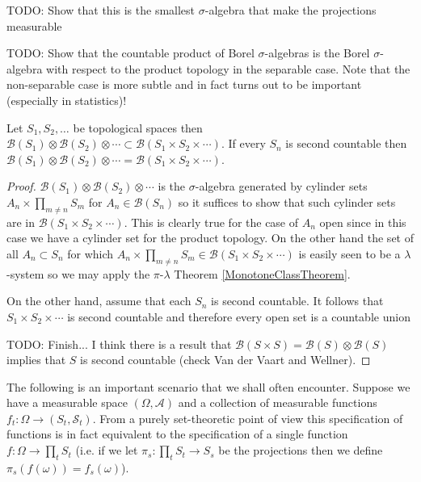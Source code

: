TODO: Show that this is the smallest $\sigma$-algebra that make the
projections measurable

TODO: Show that the countable product of Borel $\sigma$-algebras is the Borel
$\sigma$-algebra with respect to the product topology in the separable
case.  Note that the non-separable case is more subtle and in fact
turns out to be important (especially in statistics)!

\begin{prop}\label{BorelProductSigmaAlgebrasOnProductSpaces}Let $S_1, S_2, \dotsc$ be topological spaces then
  $\mathcal{B}(S_1) \otimes \mathcal{B}(S_2) \otimes \dotsb \subset
  \mathcal{B}(S_1 \times S_2 \times \dotsb)$.  If every $S_n$ is
  second countable then $\mathcal{B}(S_1) \otimes \mathcal{B}(S_2) \otimes \dotsb =
  \mathcal{B}(S_1 \times S_2 \times \dotsb)$.
\end{prop}
\begin{proof}
$\mathcal{B}(S_1) \otimes \mathcal{B}(S_2) \otimes \dotsb$ is the
$\sigma$-algebra generated by cylinder sets $A_n \times \prod_{m \neq
  n} S_m$ for $A_n \in \mathcal{B}(S_n)$ so it suffices to show that
such cylinder sets are in $\mathcal{B}(S_1 \times S_2 \times
\dotsb)$.  This is clearly true for the case of $A_n$ open since in
this case we have a cylinder set for the product topology.  On the
other hand the set of all $A_n \subset S_n$ for which $A_n \times \prod_{m \neq
  n} S_m \in \mathcal{B}(S_1 \times S_2 \times \dotsb)$ is easily seen
to be a $\lambda$-system so we may apply the $\pi$-$\lambda$ Theorem
\ref{MonotoneClassTheorem}.

On the other hand, assume that each $S_n$ is second countable.  It
follows that $S_1 \times S_2 \times \dotsb$ is second countable and
therefore every open set is a countable union 

TODO: Finish...  I think there is a result that $\mathcal{B}(S \times
S) = \mathcal{B}(S) \otimes \mathcal{B}(S)$ implies that $S$ is second
countable (check Van der Vaart and Wellner).
\end{proof}

The following is an important scenario that we shall often encounter.
Suppose we have a measurable space $(\Omega, \mathcal{A})$ and a
collection of measurable functions $f_t : \Omega \to (S_t,
\mathcal{S}_t)$.  From a purely set-theoretic point of view this
specification of functions is in fact
equivalent to the specification of a single function $f : \Omega \to
\prod_t S_t$ (i.e. if we let $\pi_s : \prod_t S_t \to S_s$ be the
projections then we define $\pi_s(f(\omega)) = f_s(\omega)$).  


